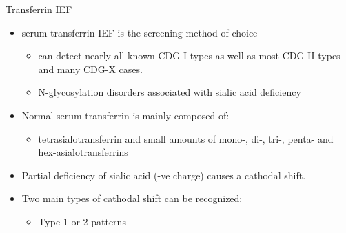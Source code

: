 \documentclass[presentation, smaller]{beamer}
\begin{document}
\begin{frame}[label={sec:org81032ba}]{Transferrin IEF}
\begin{itemize}
\item serum transferrin IEF is the screening method of choice

\begin{itemize}
\item can detect nearly all known CDG-I types as well as most CDG-II types and many CDG-X cases.
\item N-glycosylation disorders associated with sialic acid deficiency
\end{itemize}

\item Normal serum transferrin is mainly composed of:
\begin{itemize}
\item tetrasialotransferrin and small amounts of mono-, di-, tri-,
penta- and hex-asialotransferrins
\end{itemize}

\item Partial deficiency of sialic acid (-ve charge) causes a
cathodal shift.

\item Two main types of cathodal shift can be recognized:
\begin{itemize}
\item Type 1 or 2 patterns
\end{itemize}
\end{itemize}
\end{frame}
\end{document}
